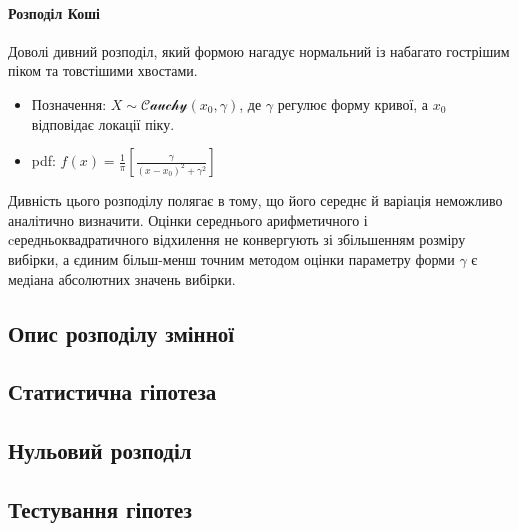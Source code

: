 \documentclass[
  11pt,
]{book}
\begin{document}
\paragraph{Розподіл
Коші}\label{ux440ux43eux437ux43fux43eux434ux456ux43b-ux43aux43eux448ux456}

Доволі дивний розподіл, який формою нагадує нормальний із набагато
гострішим піком та товстішими хвостами.

\begin{itemize}
\item
  Позначення: \(X \sim \mathcal{Cauchy}(x_0, \gamma)\), де \(\gamma\)
  регулює форму кривої, а \(x_0\) відповідає локації піку.
\item
  pdf:
  \(f(x) = \frac{1}{\pi} \left[ \frac{\gamma}{(x - x_0)^2 + \gamma^2} \right]\)
\end{itemize}

Дивність цього розподілу полягає в тому, що його середнє й варіація
неможливо аналітично визначити. Оцінки середнього арифметичного і
cередньоквадратичного відхилення не конвергують зі збільшенням розміру
вибірки, а єдиним більш-менш точним методом оцінки параметру форми
\(\hat{\gamma}\) є медіана абсолютних значень вибірки.

\subsection{Опис розподілу
змінної}\label{ux43eux43fux438ux441-ux440ux43eux437ux43fux43eux434ux456ux43bux443-ux437ux43cux456ux43dux43dux43eux457}

\subsection{Статистична
гіпотеза}\label{ux441ux442ux430ux442ux438ux441ux442ux438ux447ux43dux430-ux433ux456ux43fux43eux442ux435ux437ux430}

\subsection{Нульовий
розподіл}\label{ux43dux443ux43bux44cux43eux432ux438ux439-ux440ux43eux437ux43fux43eux434ux456ux43b}

\subsection{Тестування
гіпотез}\label{ux442ux435ux441ux442ux443ux432ux430ux43dux43dux44f-ux433ux456ux43fux43eux442ux435ux437}
\end{document}
